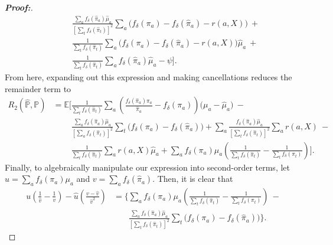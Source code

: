 \documentclass[11pt,twoside]{article}
\theoremstyle{definition}
\theoremstyle{remark}
\begin{document}
\begin{proof}[\textbf{Proof:}]
\begin{align*}
    &\phantom{{}={\mathbb{E} \Bigg[}}  \frac{\sum_a f_\delta( \widehat{\pi}_a) \widehat{\mu}_a}{\left[\sum_t f_\delta(\widehat{\pi}_t) \right]^2}  \sum_a \Big(  f_\delta(\pi_a) - f_\delta(\widehat{\pi}_a) - r(a, X) \Big) \: + \\
    &\phantom{{}={\mathbb{E} \Bigg[ }} \frac{1}{\sum_t f_\delta(\widehat{\pi}_t)} \sum_a \Big(  f_\delta(\pi_a) - f_\delta(\widehat{\pi}_a) - r(a, X) \Big)\widehat{\mu}_a   \: + \\
    &\phantom{{}={\mathbb{E} \Bigg[ }} \frac{1}{\sum_t f_\delta(\widehat{\pi}_t)} \sum_a f_\delta(\widehat{\pi}_a) \widehat{\mu}_a  - \psi \Bigg].
\end{align*}
From here, expanding out this expression and making cancellations reduces the remainder term to
\begin{align*}
     R_2(\widehat{\mathbb{P}}, \mathbb{P}) &=  \mathbb{E} \Bigg[ \frac{1}{\sum_t f_\delta(\widehat{\pi}_t)}\sum_a \left(\frac{f_\delta(\widehat{\pi}_a) \pi_a}{\widehat{\pi}_a} - f_\delta(\pi_a) \right)\big(\mu_a - \widehat{\mu}_a \big) \: - \\
    &\phantom{{}={\mathbb{E} \Bigg[}}  \frac{\sum_a f_\delta( \widehat{\pi}_a) \widehat{\mu}_a}{\left[\sum_a f_\delta(\widehat{\pi}_t) \right]^2}  \sum_t \Big(  f_\delta(\pi_a) - f_\delta(\widehat{\pi}_a) \Big) +   \sum_a \frac{f_\delta( \widehat{\pi}_a) \widehat{\mu}_a}{\left[\sum_t f_\delta(\widehat{\pi}_t) \right]^2}  \sum_a r(a, X)   \: - \\
    &\phantom{{}={\mathbb{E} \Bigg[ }} \frac{1}{\sum_t f_\delta(\widehat{\pi}_t)} \sum_a  r(a, X) \widehat{\mu}_a  + \sum_a f_\delta(\pi_a ) \mu_a \left(\frac{1}{\sum_t f_\delta(\widehat{\pi}_t)} - \frac{1}{\sum_t f_\delta(\pi_t )} \right) \Bigg].
\end{align*}
Finally, to algebraically manipulate our expression into second-order terms, let $u = \sum_a f_\delta (\pi_a) \mu_a$ and $v = \sum_a f_\delta(\widehat{\pi}_a)$. Then, it is clear that
\begin{align*}
    u\left( \frac{1}{\widehat{v}} - \frac{1}{v}\right) - \widehat{u}\left( \frac{v - \widehat{v}}{\widehat{v}^2}\right) &= \Bigg\{ \sum_a f_\delta(\pi_a ) \mu_a \left(\frac{1}{\sum_t f_\delta(\widehat{\pi}_t)} - \frac{1}{\sum_t f_\delta(\pi_t )} \right) \: - \\
    &\phantom{{}={\Bigg\{}} \frac{\sum_a f_\delta( \widehat{\pi}_a) \widehat{\mu}_a}{\left[\sum_t f_\delta(\widehat{\pi}_t) \right]^2}  \sum_t \Big(  f_\delta(\pi_a) - f_\delta(\widehat{\pi}_a) \Big) \Bigg\}.
\end{align*}

\end{proof}
\end{document}
